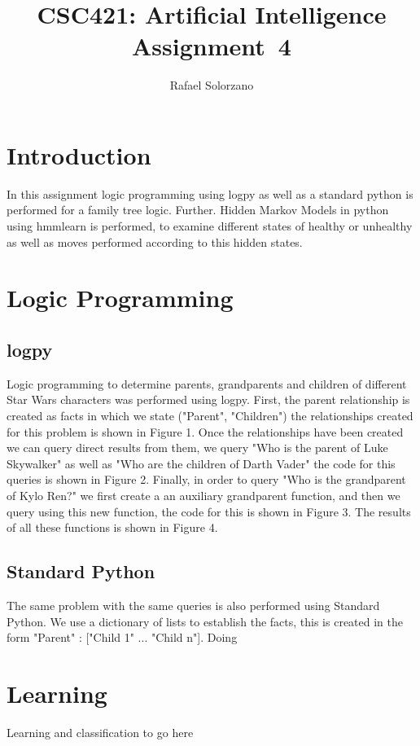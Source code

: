 \documentclass[12pt, letter]{article}
\newcommand{\courseName}{CSC421: Artificial Intelligence}
\newcommand{\assignName}{Assignment~4}
\begin{document}
\pagestyle{titlesec_assignment}

\title{\courseName\\\assignName}
\author{Rafael Solorzano}
\maketitle

\section{Introduction}

In this assignment logic programming using logpy as well as a standard python is performed for a family tree logic. Further. Hidden Markov Models in python using hmmlearn is performed, to examine different states of healthy or unhealthy as well as moves performed according to this hidden states. 

\section{Logic Programming}

\subsection{logpy}

Logic programming to determine parents, grandparents and children of different Star Wars characters was performed using logpy. First, the parent relationship is created as facts in which we state ("Parent", "Children") the relationships created for this problem is shown in Figure 1. Once the relationships have been created we can query direct results from them, we query "Who is the parent of Luke Skywalker" as well as "Who are the children of Darth Vader" the code for this queries is shown in Figure 2. Finally, in order to query "Who is the grandparent of Kylo Ren?" we first create a an auxiliary grandparent function, and then we query using this new function, the code for this is shown in Figure 3. The results of all these functions is shown in Figure 4.

\subsection{Standard Python}

The same problem with the same queries is also performed using Standard Python. We use a dictionary of lists to establish the facts, this is created in the form "Parent" : ["Child 1" ... "Child n"]. Doing 

\section{Learning}

Learning and classification to go here
\end{document}
